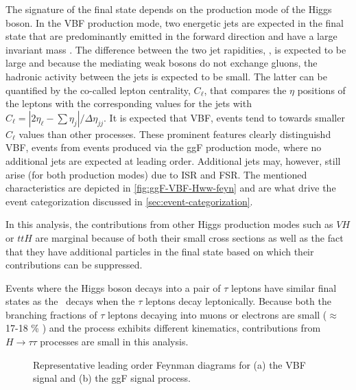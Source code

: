 The signature of the final state depends on the production mode of the Higgs boson.
In the VBF production mode, two energetic jets are expected in the final state that are predominantly emitted in the forward direction and have a large invariant mass \mjj. 
The difference between the two jet rapidities, \dyjj, is expected to be large and because the mediating weak bosons do not exchange gluons, the hadronic activity between the jets is expected to be small. 
The latter can be quantified by the co-called lepton centrality, $C_\ell$, that compares the $\eta$ positions of the leptons with the corresponding values for the jets with $C_\ell = |2\eta_\ell - \sum \eta_j| / \Delta \eta_{jj}$. It is expected that VBF, \HWW events tend to towards smaller $C_\ell$ values than other processes.
These prominent features clearly distinguishd VBF, \HWW events from events produced via the ggF production mode, where no additional jets are expected at leading order. Additional jets may, however, still arise (for both production modes) due to ISR and FSR. The mentioned characteristics are depicted in \cref{fig:ggF-VBF-Hww-feyn} and are what drive the event categorization discussed in \cref{sec:event-categorization}. 

In this analysis, the contributions from other Higgs production modes such as $VH$ or $ttH$ are marginal because of both their small cross sections as well as the fact that they have additional particles in the final state based on which their contributions can be suppressed.

Events where the Higgs boson decays into a pair of $\tau$ leptons have similar final states as the \HWWdet\ decays when the $\tau$ leptons decay leptonically. 
Because both the branching fractions of $\tau$ leptons decaying into muons or electrons are small ($\approx$ 17-18 \% \cite{PDG2020}) and the process exhibits different kinematics, contributions from $H \to \tau\tau$ processes are small in this analysis. 

\begin{figure}[t]
    \caption{Representative leading order Feynman diagrams for (a) the VBF signal and (b) the ggF signal process.} 
    \label{fig:feyn:wwprod}
\end{figure}

